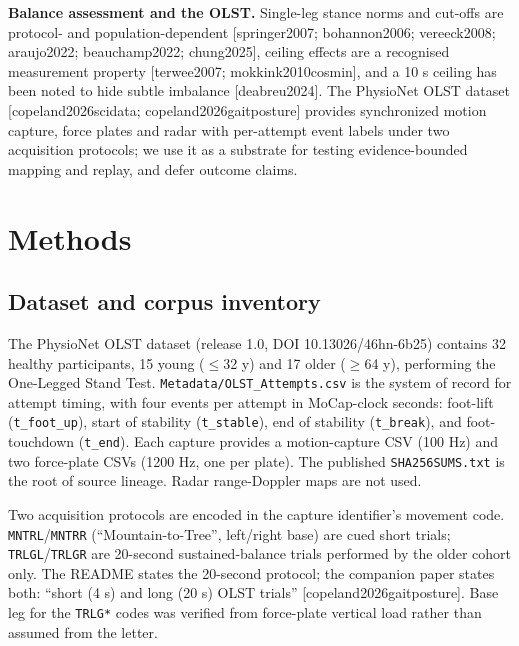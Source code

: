 \documentclass[11pt]{article}
\begin{document}
\textbf{Balance assessment and the OLST.} Single-leg stance norms and cut-offs are protocol- and population-dependent [springer2007; bohannon2006; vereeck2008; araujo2022; beauchamp2022; chung2025], ceiling effects are a recognised measurement property [terwee2007; mokkink2010cosmin], and a 10 s ceiling has been noted to hide subtle imbalance [deabreu2024]. The PhysioNet OLST dataset [copeland2026scidata; copeland2026gaitposture] provides synchronized motion capture, force plates and radar with per-attempt event labels under two acquisition protocols; we use it as a substrate for testing evidence-bounded mapping and replay, and defer outcome claims.

\section{Methods}\label{methods}

\subsection{Dataset and corpus inventory}\label{dataset-and-corpus-inventory}

The PhysioNet OLST dataset (release 1.0, DOI 10.13026/46hn-6b25) contains 32 healthy participants, 15 young ($\leq$32 y) and 17 older ($\geq$64 y), performing the One-Legged Stand Test. \texttt{Metadata/OLST\_Attempts.csv} is the system of record for attempt timing, with four events per attempt in MoCap-clock seconds: foot-lift (\texttt{t\_foot\_up}), start of stability (\texttt{t\_stable}), end of stability (\texttt{t\_break}), and foot-touchdown (\texttt{t\_end}). Each capture provides a motion-capture CSV (100 Hz) and two force-plate CSVs (1200 Hz, one per plate). The published \texttt{SHA256SUMS.txt} is the root of source lineage. Radar range-Doppler maps are not used.

Two acquisition protocols are encoded in the capture identifier's movement code. \texttt{MNTRL}/\texttt{MNTRR} (``Mountain-to-Tree'', left/right base) are cued short trials; \texttt{TRLGL}/\texttt{TRLGR} are 20-second sustained-balance trials performed by the older cohort only. The README states the 20-second protocol; the companion paper states both: ``short (4 s) and long (20 s) OLST trials'' [copeland2026gaitposture]. Base leg for the \texttt{TRLG*} codes was verified from force-plate vertical load rather than assumed from the letter.
\end{document}
